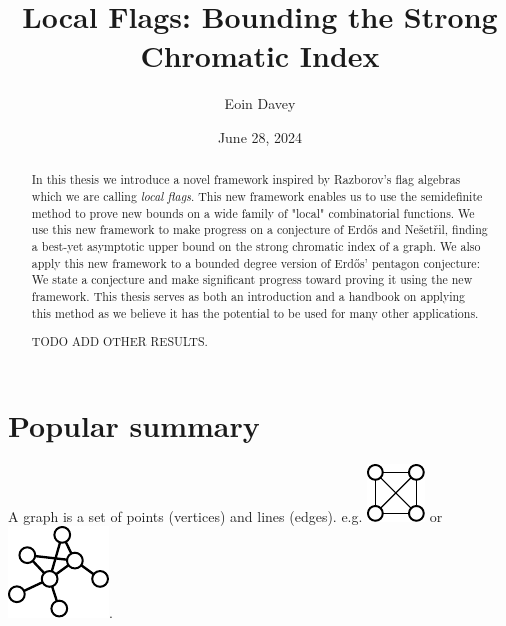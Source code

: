 \documentclass{uvamath}
\title{Local Flags: Bounding the Strong Chromatic Index} %
\author[eoin.davey@student.uva.nl, 14246287]{Eoin Davey} %
\date{June 28, 2024} %
\begin{document}
\maketitle

\begin{abstract}
    In this thesis we introduce a novel framework inspired by Razborov's flag algebras
    which we are calling \textit{local flags}. This new framework enables us to use
    the semidefinite method to prove new bounds on a wide family of "local" combinatorial
    functions. We use this new framework to
    make progress on a conjecture of Erd\H{o}s and Nešetřil, finding a
    best-yet asymptotic upper bound on the strong chromatic index of a graph.
    We also apply this new framework to a bounded degree version of Erd\H{o}s' pentagon
    conjecture: We state a conjecture and make significant progress toward proving it using
    the new framework. This thesis serves as both an introduction and a handbook on applying
    this method as we believe it has the potential to be used for many other applications.

    TODO ADD OTHER RESULTS.
\end{abstract}

\setcounter{tocdepth}{1}
\tableofcontents











\chapter*{Popular summary}
A graph is a set of points (vertices) and lines (edges).
e.g. \includegraphics[align=c,scale=1]{flags/k4} or
\includegraphics[align=c,scale=0.75]{pop_sum_graph}.
\end{document}
